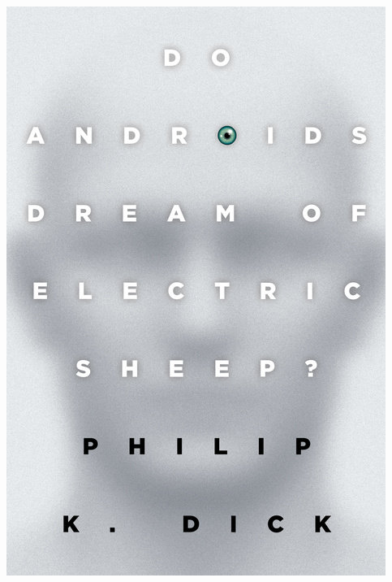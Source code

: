 \documentclass{tufte-handout}
\makeatletter
\newcommand{\varcaption}[2][0pt]{%
  \gsetlength{\@tufte@caption@vertical@offset}{-#1}%
  \gdef\@tufte@stored@varcaption{#2}%
}
\gdef\@tufte@stored@varcaption{} %
\makeatother
\begin{document}
\begin{marginfigure}[17\baselineskip]
   \includegraphics[width=\linewidth]{images/do_androids_dream_of_electric_sheep.jpg}
   \varcaption{\href{https://www.penguinrandomhouse.com/books/40617/do-androids-dream-of-electric-sheep-by-philip-k-dick/}{Publisher Link}, \href{https://www.amazon.com/Androids-Dream-Electric-Sheep-inspiration/dp/0345404475}{Amazon Link}}
\end{marginfigure}
\end{document}
